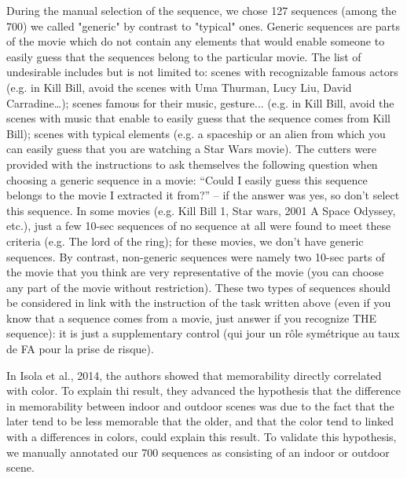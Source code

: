 \documentclass[sigconf]{acmart}
\begin{document}
During the manual selection of the sequence, we chose 127 sequences (among the 700) we called "generic" by contrast to "typical" ones. Generic sequences are parts of the movie which do not contain any elements that would enable someone to easily guess that the sequences belong to the particular movie. The list of undesirable includes but is not limited to: scenes with recognizable famous actors (e.g. in Kill Bill, avoid the scenes with Uma Thurman, Lucy Liu, David Carradine…); scenes famous for their music, gesture... (e.g. in Kill Bill, avoid the scenes with music that enable to easily guess that the sequence comes from Kill Bill); scenes with typical elements (e.g. a spaceship or an alien from which you can easily guess that you are watching a Star Wars movie). The cutters were provided with the instructions to ask themselves the following question when choosing a generic sequence in a movie: “Could I easily guess this sequence belongs to the movie I extracted it from?” -- if the answer was yes, so don’t select this sequence.
In some movies (e.g. Kill Bill 1, Star wars, 2001 A Space Odyssey, etc.), just a few 10-sec sequences of no sequence at all were found to meet these criteria (e.g. The lord of the ring); for these movies, we don't have generic sequences.
By contrast, non-generic sequences were namely two 10-sec parts of the movie that you think are very representative of the movie (you can choose any part of the movie without restriction).
These two types of sequences should be considered in link with the instruction of the task written above (even if you know that a sequence comes from a movie, just answer if you recognize THE sequence): it is just a supplementary control (qui jour un rôle symétrique au taux de FA pour la prise de risque).

In Isola et al., 2014, the authors showed that memorability directly correlated with color. To explain thi result, they advanced the hypothesis that the difference in memorability between indoor and outdoor scenes was due to the fact that the later tend to be less memorable that the older, and that the color tend to linked with a differences in colors, could explain this result. To validate this hypothesis, we manually annotated our 700 sequences as consisting of an indoor or outdoor scene.

\end{document}
